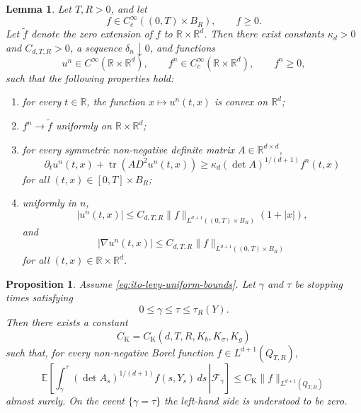 \documentclass[10pt,a4paper]{amsart}
\newtheorem{proposition}{Proposition}
\newtheorem{lemma}{Lemma}
\begin{document}
	\begin{lemma}
		\label{lem:global-aleksandrov-regularization}
		Let $T,R>0$, and let
		\[
		f\in C_c^\infty((0,T)\times B_R),
		\qquad f\geq0.
		\]
		Let $\widetilde f$ denote the zero extension of $f$ to
		$\mathbb R\times\mathbb R^d$. Then there exist constants
		$\kappa_d>0$ and $C_{d,T,R}>0$, a sequence
		$\delta_n\downarrow0$, and functions
		\[
		u^n\in C^\infty(\mathbb R\times\mathbb R^d),
		\qquad
		f^n\in C_c^\infty(\mathbb R\times\mathbb R^d),
		\qquad
		f^n\geq0,
		\]
		such that the following properties hold:
		\begin{enumerate}
			\item[\textnormal{(i)}]
			for every $t\in\mathbb R$, the function
			$x\mapsto u^n(t,x)$ is convex on $\mathbb R^d$;
			
			\item[\textnormal{(ii)}]
			$f^n\to\widetilde f$ uniformly on
			$\mathbb R\times\mathbb R^d$;
			
			\item[\textnormal{(iii)}]
			for every symmetric non-negative definite matrix
			$A\in\mathbb R^{d\times d}$,
			\begin{equation}
				\label{eq:appendix-smoothed-aleksandrov-inequality}
				\partial_tu^n(t,x)
				+
				\operatorname{tr}\!\left(A D^2u^n(t,x)\right)
				\geq
				\kappa_d(\det A)^{1/(d+1)}f^n(t,x)
			\end{equation}
			for all $(t,x)\in[0,T]\times B_R$;
			
			\item[\textnormal{(iv)}]
			uniformly in $n$,
			\begin{equation}
				\label{eq:appendix-global-growth-bound}
				|u^n(t,x)|
				\leq
				C_{d,T,R}
				\|f\|_{L^{d+1}((0,T)\times B_R)}
				(1+|x|),
			\end{equation}
			and
			\begin{equation}
				\label{eq:appendix-global-gradient-bound}
				|\nabla u^n(t,x)|
				\leq
				C_{d,T,R}
				\|f\|_{L^{d+1}((0,T)\times B_R)}
			\end{equation}
			for all $(t,x)\in\mathbb R\times\mathbb R^d$.
		\end{enumerate}
	\end{lemma}

	\begin{proposition}
		\label{thm:local-weighted-krylov}
		Assume \eqref{eq:ito-levy-uniform-bounds}. Let $\gamma$ and $\tau$ be	stopping times satisfying
		\[
		0\le\gamma\le\tau\le\tau_R(Y).
		\]
		Then there exists a constant
		\[
		C_{\mathrm K}=C_{\mathrm K}(d,T,R,K_b,K_\sigma,K_g)
		\]
		such that, for every non-negative Borel function
		$f\in L^{d+1}(Q_{T,R})$,
		\begin{equation}
			\label{eq:weighted-conditional-krylov}
			\mathbb E\left[\left.\int_\gamma^\tau(\det A_s)^{1/(d+1)}f(s,Y_s)\,ds\,\right|\mathcal F_\gamma\right]
			\le
			C_{\mathrm K}\|f\|_{L^{d+1}(Q_{T,R})}
		\end{equation}
		almost surely. On the event $\{\gamma=\tau\}$ the left-hand side is understood to be zero.
	\end{proposition}
\end{document}
